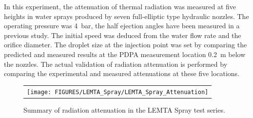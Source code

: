 In this experiment, the attenuation of thermal radiation was measured at five heights in water sprays produced by seven full-elliptic type hydraulic nozzles.
The operating pressure was 4~bar,
the half ejection angles have been measured in a previous study. The initial speed was deduced from the water flow rate and the orifice diameter.
The droplet size at the injection point was set by comparing the predicted and measured results at the PDPA measurement location 0.2~m below the nozzles.
The actual validation of radiation attenuation is performed by comparing the experimental and measured attenuations at these five locations.
\begin{figure}[p]
\begin{center}
\begin{tabular}{c}
\texttt{[image: FIGURES/LEMTA\_Spray/LEMTA\_Spray\_Attenuation]}
\end{tabular}
\end{center}
\label{LEMTA_Spray_Attenuation}
\caption[Summary of radiation attenuation, LEMTA Spray test series.]{Summary of radiation attenuation in the LEMTA Spray test series.}
\end{figure}
